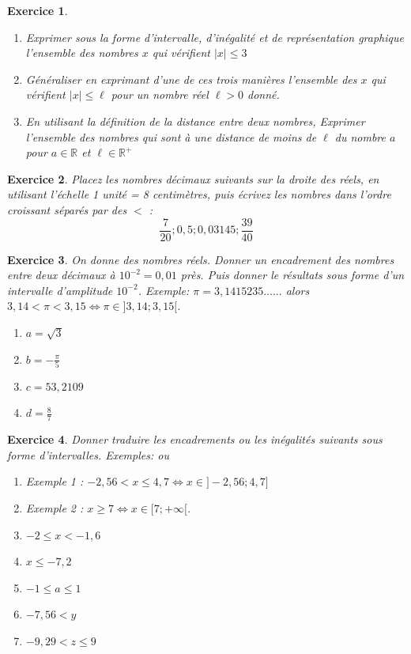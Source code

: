 \documentclass[10pt,a4paper]{article}
\newcommand{\R}{\mathbb{R}}
\newtheorem{exo}{Exercice}
\begin{document}
\newpage

\setcounter{exo}{11}


\begin{exo}
    \begin{enumerate}
        \item Exprimer sous la forme d'intervalle, d'inégalité et de représentation graphique l'ensemble des nombres $x$ qui vérifient $\lvert x \rvert \leq 3$
        \item Généraliser en exprimant d'une de ces trois manières l'ensemble des $x$ qui vérifient $\lvert x \rvert \leq \ell$ pour un nombre réel $\ell > 0$ donné.
        \item En utilisant la définition de la distance entre deux nombres, Exprimer l'ensemble des nombres qui sont à une distance de moins de $\ell$ du nombre $a$  pour $a \in \R$ et $\ell \in \R^+$
    \end{enumerate}

    
\end{exo}

\begin{exo}
  Placez les nombres décimaux suivants sur la droite des réels, en utilisant l'échelle 1 unité = 8 centimètres, puis écrivez les nombres dans l'ordre croissant séparés par des $<$ :
  $$\frac{7}{20}; 0,5; 0,03145; \frac{39}{40}$$
\end{exo}

\begin{exo}
  On donne des nombres réels. Donner un encadrement des nombres entre deux 
  décimaux à $10^{-2} = 0{,}01$ près. Puis donner le résultats sous forme d'un intervalle d'amplitude $10^{-2}$.
  Exemple: $\pi=3{,}1415235......$ alors $3,14<\pi<3,15\Longleftrightarrow 
  \pi\in]3{,}14;3{,}15[$.
 \begin{enumerate}
   \item $a=\sqrt{3}$
   \item $b=-\frac{\pi}{5}$
   \item $c=53{,}2109$
   \item $d=\frac{8}{7}$
 \end{enumerate}
\end{exo}

\begin{exo}
  Donner traduire les encadrements ou les inégalités suivants sous forme 
  d'intervalles. 
  Exemples:  ou 
  
  \begin{enumerate}
  \item Exemple 1 : $-2,56<x\leq 4,7\Longleftrightarrow x\in ]-2,56;4,7]$
  \item Exemple 2 : $x\geq 7\Longleftrightarrow x\in[7;+\infty[$.
    \item $-2\leq x<-1,6 $
    \item $x\leq -7,2$
    \item $-1\leq a\leq 1$
    \item $-7,56<y$
    \item $-9,29<z\leq 9$
  \end{enumerate}
\end{exo}
\end{document}
